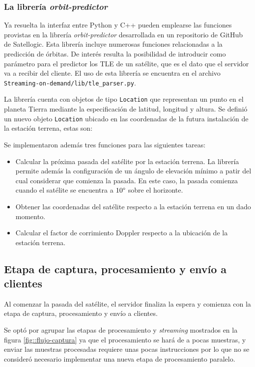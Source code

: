 \documentclass[../../main.tex]{subfiles}
\begin{document}
\subsubsection{La librería \textit{orbit-predictor}}
Ya resuelta la interfaz entre Python y C++ pueden emplearse las funciones provistas en la librería \textit{orbit-predictor} desarrollada en un repositorio de GitHub de Satellogic\cite{orbit-predictor}. Esta librería incluye numerosas funciones relacionadas a la predicción de órbitas. De interés resulta la posibilidad de introducir como parámetro para el predictor los TLE de un satélite, que es el dato que el servidor va a recibir del cliente.
El uso de esta librería se encuentra en el archivo \texttt{Streaming-on-demand/lib/tle\_parser.py}. 

La librería cuenta con objetos de tipo \texttt{Location} que representan un punto en el planeta Tierra mediante la especificación de latitud, longitud y altura. Se definió un nuevo objeto \texttt{Location} ubicado en las coordenadas de la futura instalación de la estación terrena, estas son:

Se implementaron además tres funciones para las siguientes tareas:
\begin{itemize}
    \item Calcular la próxima pasada del satélite por la estación terrena. La librería permite además la configuración de un ángulo de elevación mínimo a patir del cual considerar que comienza la pasada. En este caso, la pasada comienza cuando el satélite se encuentra a $10\degree$ sobre el horizonte.
    \item Obtener las coordenadas del satélite respecto a la estación terrena en un dado momento.
    \item Calcular el factor de corrimiento Doppler respecto a la ubicación de la estación terrena.
\end{itemize}

\subsection{Etapa de captura, procesamiento y envío a clientes}
Al comenzar la pasada del satélite, el servidor finaliza la espera y comienza con la etapa de captura, procesamiento y envío a clientes.

Se optó por agrupar las etapas de procesamiento y \textit{streaming} mostrados en la figura \ref{fig::flujo-captura} ya que el procesamiento se hará de a pocas muestras, y enviar las muestras procesadas requiere unas pocas instrucciones por lo que no se consideró necesario implementar una nueva etapa de procesamiento paralelo.
\end{document}
